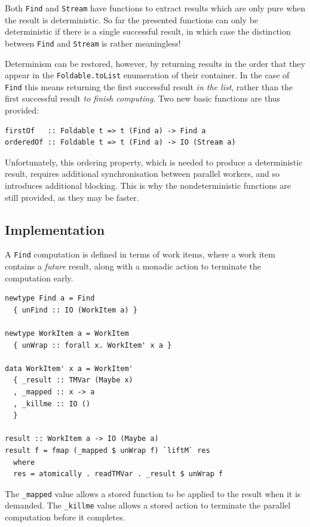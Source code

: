Both \verb|Find| and \verb|Stream| have functions to extract results
which are only pure when the result is deterministic. So far the
presented functions can only be deterministic if there is a single
successful result, in which case the distinction between \verb|Find|
and \verb|Stream| is rather meaningless!

Determinism can be restored, however, by returning results in the
order that they appear in the \verb|Foldable.toList| enumeration of
their container. In the case of \verb|Find| this means returning the
first successful result \textit{in the list}, rather than the first
successful result \textit{to finish computing}. Two new basic
functions are thus provided:

\begin{verbatim}
firstOf   :: Foldable t => t (Find a) -> Find a
orderedOf :: Foldable t => t (Find a) -> IO (Stream a)
\end{verbatim}

Unfortunately, this ordering property, which is needed to produce a
deterministic result, requires additional synchronisation between
parallel workers, and so introduces additional blocking. This is why
the nondeterministic functions are still provided, as they may be
faster.

\subsection{Implementation}
\label{sec:prelims-searchparty-impl}

A \verb|Find| computation is defined in terms of work items, where a
work item contains a \textit{future} result, along with a monadic
action to terminate the computation early.

\begin{verbatim}
newtype Find a = Find
  { unFind :: IO (WorkItem a) }

newtype WorkItem a = WorkItem
  { unWrap :: forall x. WorkItem' x a }

data WorkItem' x a = WorkItem'
  { _result :: TMVar (Maybe x)
  , _mapped :: x -> a
  , _killme :: IO ()
  }

result :: WorkItem a -> IO (Maybe a)
result f = fmap (_mapped $ unWrap f) `liftM` res
  where
  res = atomically . readTMVar . _result $ unWrap f
\end{verbatim}

The \verb|_mapped| value allows a stored function to be applied
to the result when it is demanded. The \verb|_killme| value allows
a stored action to terminate the parallel computation before it
completes.

